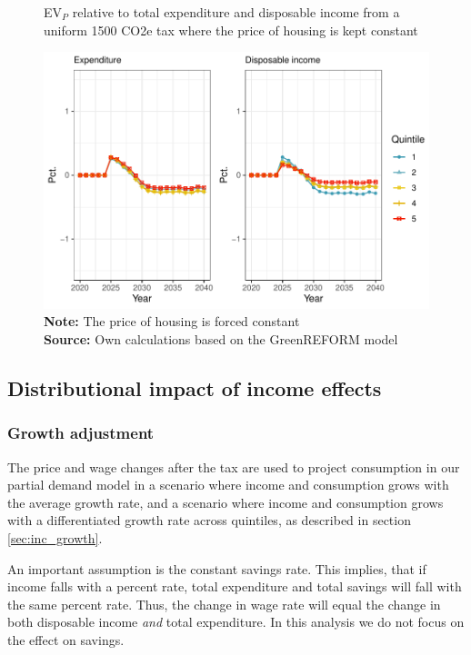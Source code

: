 \begin{figure}[H]
\centering
\caption{EV$_P$ relative to total expenditure and disposable income from a uniform 1500 CO2e tax where the price of housing is kept constant}
\label{tax1_EVP_hous}
\includegraphics[width=.9\textwidth]{Figures/EV_P_tax1_hous.pdf}
\captionsetup{singlelinecheck=off,size=scriptsize}
\setlength{\captionmargin}{10pt}
\caption*{
\textbf{Note:} The price of housing is forced constant\\
\textbf{Source:} Own calculations based on the GreenREFORM model}
\end{figure}


\subsection{Distributional impact of income effects}
\subsubsection{Growth adjustment}

The price and wage changes after the tax are used to project consumption in our partial demand model in a scenario where income and consumption grows with the average growth rate, and a scenario where income and consumption grows with a differentiated growth rate across quintiles, as described in section \ref{sec:inc_growth}. 

An important assumption is the constant savings rate. This implies, that if income falls with a percent rate, total expenditure and total savings will fall with the same percent rate. Thus, the change in wage rate will equal the change in both disposable income \textit{and} total expenditure. In this analysis we do not focus on the effect on savings.


